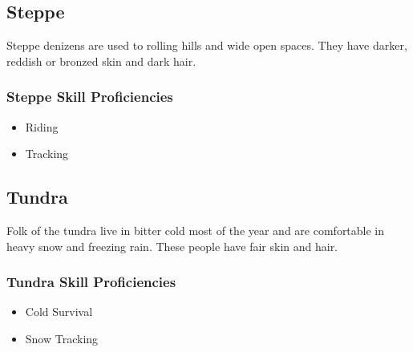 \begin{multicols}{2}
\subsection{Steppe}

Steppe denizens are used to rolling hills and wide open spaces. They have
darker, reddish or bronzed skin and dark hair.

\subsubsection{Steppe Skill Proficiencies}

\begin{itemize}
  \item Riding
  \item Tracking
\end{itemize}

\subsection{Tundra}

Folk of the tundra live in bitter cold most of the year and are comfortable
in heavy snow and freezing rain. These people have fair skin and hair.

\subsubsection{Tundra Skill Proficiencies}

\begin{itemize}
  \item Cold Survival
  \item Snow Tracking
\end{itemize}

\end{multicols}
